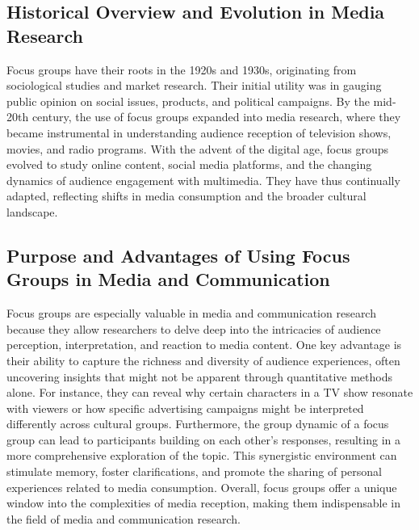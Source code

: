 \documentclass[
  b5paper]{book}
\begin{document}
\hypertarget{historical-overview-and-evolution-in-media-research}{%
\subsection*{Historical Overview and Evolution in Media Research}\label{historical-overview-and-evolution-in-media-research}}

Focus groups have their roots in the 1920s and 1930s, originating from sociological studies and market research. Their initial utility was in gauging public opinion on social issues, products, and political campaigns. By the mid-20th century, the use of focus groups expanded into media research, where they became instrumental in understanding audience reception of television shows, movies, and radio programs. With the advent of the digital age, focus groups evolved to study online content, social media platforms, and the changing dynamics of audience engagement with multimedia. They have thus continually adapted, reflecting shifts in media consumption and the broader cultural landscape.

\hypertarget{purpose-and-advantages-of-using-focus-groups-in-media-and-communication}{%
\subsection*{Purpose and Advantages of Using Focus Groups in Media and Communication}\label{purpose-and-advantages-of-using-focus-groups-in-media-and-communication}}

Focus groups are especially valuable in media and communication research because they allow researchers to delve deep into the intricacies of audience perception, interpretation, and reaction to media content. One key advantage is their ability to capture the richness and diversity of audience experiences, often uncovering insights that might not be apparent through quantitative methods alone. For instance, they can reveal why certain characters in a TV show resonate with viewers or how specific advertising campaigns might be interpreted differently across cultural groups. Furthermore, the group dynamic of a focus group can lead to participants building on each other's responses, resulting in a more comprehensive exploration of the topic. This synergistic environment can stimulate memory, foster clarifications, and promote the sharing of personal experiences related to media consumption. Overall, focus groups offer a unique window into the complexities of media reception, making them indispensable in the field of media and communication research.
\end{document}
